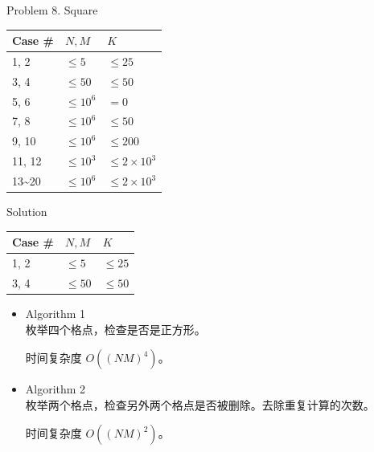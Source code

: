 \documentclass[UTF8]{beamer}
\begin{document}
\begin{frame}{Problem 8. Square}

\begin{tabularx}{\textwidth}{X|X|X} \hline
Case \# & $N, M$ & $K$ \\ \hline \hline
1, 2   & $\leq 5$    & $\leq 25$            \\ \hline
3, 4   & $\leq 50$   & $\leq 50$            \\ \hline
5, 6   & $\leq 10^6$ & $= 0$                \\ \hline
7, 8   & $\leq 10^6$ & $\leq 50$            \\ \hline
9, 10  & $\leq 10^6$ & $\leq 200$           \\ \hline
11, 12 & $\leq 10^3$ & $\leq 2 \times 10^3$ \\ \hline
13\textasciitilde 20 & $\leq 10^6$ & $\leq 2 \times 10^3$ \\ \hline
\end{tabularx}

\end{frame}

\begin{frame}{Solution}

\begin{tabularx}{\textwidth}{X|X|X} \hline
Case \# & $N, M$ & $K$ \\ \hline \hline
1, 2   & $\leq 5$    & $\leq 25$            \\ \hline
3, 4   & $\leq 50$   & $\leq 50$            \\ \hline
\end{tabularx}
\begin{itemize}
    \item Algorithm 1 \\
        枚举四个格点，检查是否是正方形。

        时间复杂度 $O((NM)^4)$。

    \pause\item Algorithm 2 \\
        枚举两个格点，检查另外两个格点是否被删除。去除重复计算的次数。

        时间复杂度 $O((NM)^2)$。
\end{itemize}

\end{frame}
\end{document}
